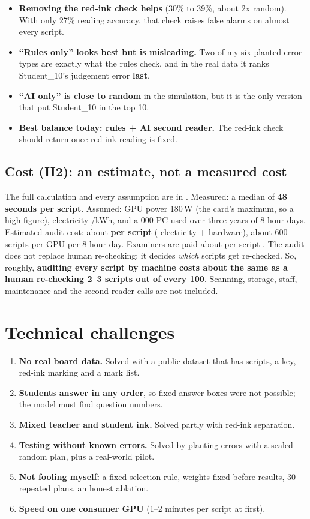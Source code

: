 \begin{itemize}
  \item \textbf{Removing the red-ink check helps} (30\% to 39\%, about 2x random). With only 27\% reading accuracy, that
        check raises false alarms on almost every script.
  \item \textbf{``Rules only'' looks best but is misleading.} Two of my six planted error types are exactly what the rules
        check, and in the real data it ranks Student\_10's judgement error \textbf{last}.
  \item \textbf{``AI only'' is close to random} in the simulation, but it is the only version that put Student\_10 in the top 10.
  \item \textbf{Best balance today: rules + AI second reader.} The red-ink check should return once red-ink reading is fixed.
\end{itemize}

\subsection{Cost (H2): an estimate, not a measured cost}
The full calculation and every assumption are in . Measured: a median of \textbf{48 seconds per script}.
Assumed: GPU power 180\,W (the card's maximum, so a high figure), electricity /kWh, and a 000 PC used over three
years of 8-hour days. Estimated audit cost: about \textbf{ per script} ( electricity +  hardware),
about 600 scripts per GPU per 8-hour day. Examiners are paid about  per script \citep{propk2023fee}. The audit does not
replace human re-checking; it decides \emph{which} scripts get re-checked. So, roughly, \textbf{auditing every script by
machine costs about the same as a human re-checking 2--3 scripts out of every 100}. Scanning, storage, staff, maintenance
and the second-reader calls are not included.

\section{Technical challenges}
\begin{enumerate}
  \item \textbf{No real board data.} Solved with a public dataset that has scripts, a key, red-ink marking and a mark list.
  \item \textbf{Students answer in any order}, so fixed answer boxes were not possible; the model must find question numbers.
  \item \textbf{Mixed teacher and student ink.} Solved partly with red-ink separation.
  \item \textbf{Testing without known errors.} Solved by planting errors with a sealed random plan, plus a real-world pilot.
  \item \textbf{Not fooling myself:} a fixed selection rule, weights fixed before results, 30 repeated plans, an honest ablation.
  \item \textbf{Speed on one consumer GPU} (1--2 minutes per script at first).
\end{enumerate}

